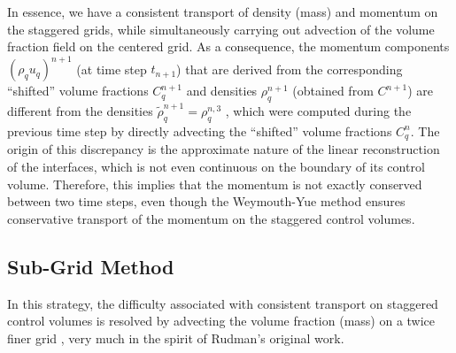 In essence, we have a consistent transport of density (mass)
and momentum on the staggered grids, while simultaneously 
carrying out advection of the volume fraction field on the centered grid. 
As a consequence, the momentum components $(\rho_q u_q)^{n+1}$ 
(at time step $t_{n+1}$) that are derived from the 
corresponding ``shifted'' volume fractions $C^{n+1}_q$ 
and densities $\rho^{n+1}_q$  (obtained from $C^{n+1}$)
are different from the densities $\tilde \rho_q^{n+1} = \rho_q^{n,3}$
, which were computed during the previous time step 
by directly advecting the ``shifted'' volume fractions $C^{n}_q$. 
The origin of this discrepancy is the approximate nature of the  
linear reconstruction of the interfaces, which is not 
even continuous on the boundary of its control volume.
Therefore, this implies that the momentum is not exactly
conserved between two time steps, even though the Weymouth-Yue method
ensures conservative transport of the momentum on the staggered control volumes. 




\subsection*{Sub-Grid Method}

In this strategy, the difficulty associated with consistent 
transport on staggered control volumes is resolved by advecting  
the volume fraction (mass) on a twice finer grid 
 , very much in the spirit of Rudman's \cite{rudman1998volume} original work. 

